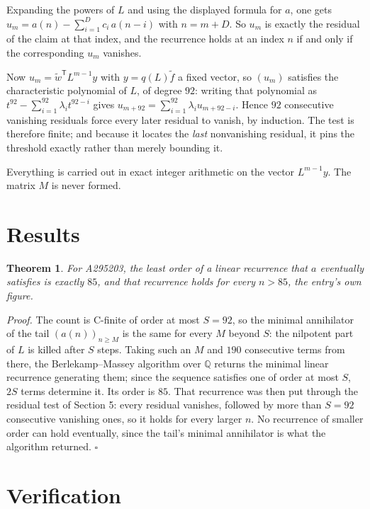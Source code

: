 \documentclass[11pt]{article}
\newtheorem{theorem}{Theorem}
\theoremstyle{definition}
\begin{document}
Expanding the powers of $L$ and using the displayed formula for $a$, one gets $u_m = a(n) - \sum_{i=1}^{D} c_i\,a(n-i)$ with $n = m + D$. So $u_m$ is exactly the residual of the claim at that index, and the recurrence holds at an index $n$ if and only if the corresponding $u_m$ vanishes.

Now $u_m = \tilde w^{\mathsf T} L^{m-1} y$ with $y = q(L)\tilde f$ a fixed vector, so $(u_m)$ satisfies the characteristic polynomial of $L$, of degree $92$: writing that polynomial as $t^{92} - \sum_{i=1}^{92} \lambda_i t^{92-i}$ gives $u_{m+92} = \sum_{i=1}^{92} \lambda_i u_{m+92-i}$. Hence $92$ consecutive vanishing residuals force every later residual to vanish, by induction. The test is therefore finite; and because it locates the {\itshape last} nonvanishing residual, it pins the threshold exactly rather than merely bounding it.

Everything is carried out in exact integer arithmetic on the vector $L^{m-1}y$. The matrix $M$ is never formed.

\section{Results}

\begin{theorem} For A295203, the least order of a linear recurrence that $a$ eventually satisfies is exactly $85$, and that recurrence holds for every $n > 85$, the entry's own figure.\end{theorem}

{\itshape Proof.} The count is C-finite of order at most $S = 92$, so the minimal annihilator of the tail $(a(n))_{n \ge M}$ is the same for every $M$ beyond $S$: the nilpotent part of $L$ is killed after $S$ steps. Taking such an $M$ and $190$ consecutive terms from there, the Berlekamp--Massey algorithm over $\mathbb{Q}$ returns the minimal linear recurrence generating them; since the sequence satisfies one of order at most $S$, $2S$ terms determine it. Its order is $85$. That recurrence was then put through the residual test of Section 5: every residual vanishes, followed by more than $S = 92$ consecutive vanishing ones, so it holds for every larger $n$. No recurrence of smaller order can hold eventually, since the tail's minimal annihilator is what the algorithm returned. $\square$

\section{Verification}
\end{document}
